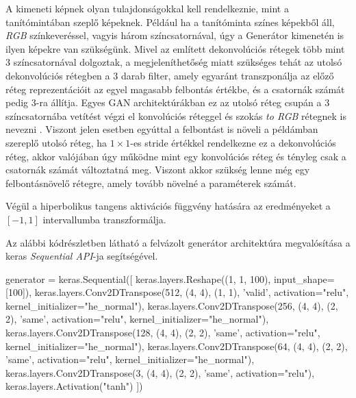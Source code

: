 A kimeneti képnek olyan tulajdonságokkal kell rendelkeznie, mint a tanítómintában szeplő képeknek. Például ha a tanítóminta színes képekből áll, \textit{RGB} színkeveréssel, vagyis három színcsatornával, úgy a Generátor kimenetén is ilyen képekre van szükségünk. Mivel az említett dekonvolúciós rétegek több mint 3 színcsatornával dolgoztak, a megjeleníthetőség miatt szükséges tehát az utolsó dekonvolúciós rétegben a 3 darab filter, amely egyaránt transzponálja az előző réteg reprezentációit az egyel magasabb felbontás értékbe, és a csatornák számát pedig 3-ra állítja.
Egyes GAN architektúrákban ez az utolsó réteg csupán a 3 színcsatornába vetítést végzi el konvolúciós réteggel és szokás \textit{to RGB} rétegnek is nevezni \cite{karras2017progressive, karras2019style, karnewar2020msg}. Viszont jelen esetben egyúttal a felbontást is növeli a példámban szereplő utolsó réteg, ha $1 \times 1$-es stride értékkel rendelkezne ez a dekonvolúciós réteg, akkor valójában úgy működne mint egy konvolúciós réteg és tényleg csak a csatornák számát változtatná meg. Viszont akkor szükség lenne még egy felbontásnövelő rétegre, amely tovább növelné a paraméterek számát.

Végül a hiperbolikus tangens aktivációs függvény hatására az eredményeket a $[-1, 1]$ intervallumba transzformálja.

Az alábbi kódrészletben látható a felvázolt generátor architektúra megvalósítása a keras \textit{Sequential API}-ja segítségével.

\begin{python}
generator = keras.Sequential([
    keras.layers.Reshape((1, 1, 100), input_shape=[100]),
    keras.layers.Conv2DTranspose(512, (4, 4), (1, 1), 'valid',
                                 activation="relu",
                                 kernel_initializer="he_normal"),
    keras.layers.Conv2DTranspose(256, (4, 4), (2, 2), 'same',
                                 activation="relu",
                                 kernel_initializer="he_normal"),
    keras.layers.Conv2DTranspose(128, (4, 4), (2, 2), 'same',
                                 activation="relu",
                                 kernel_initializer="he_normal"),
    keras.layers.Conv2DTranspose(64, (4, 4), (2, 2), 'same',
                                 activation="relu",
                                 kernel_initializer="he_normal"),
    keras.layers.Conv2DTranspose(3, (4, 4), (2, 2), 'same',
                                 activation="relu"),
    keras.layers.Activation("tanh")
])
\end{python}

